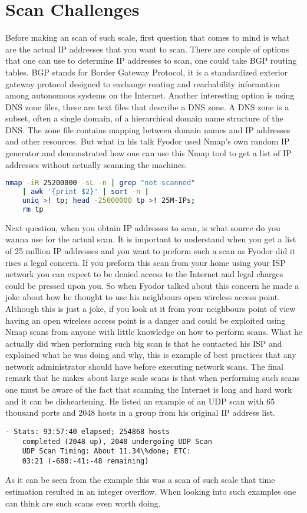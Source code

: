 \documentclass[times, utf8, seminar,english]{fer}
\begin{document}
\section{Scan Challenges}
Before making an scan of such scale, first question that comes to mind is what are the actual IP addresses that you want to scan. There are couple of options that one can use to determine IP addresses to scan, one could take BGP routing tables. BGP stands for Border Gateway Protocol, it is a standardized exterior gateway protocol designed to exchange routing and reachability information among autonomous systems on the Internet. Another interesting option is using DNS zone files, these are text files that describe a DNS zone. A DNS zone is a subset, often a single domain, of a hierarchical domain name structure of the DNS. The zone file contains mapping between domain names and IP addresses and other resources. But what in his talk Fyodor used Nmap's own random IP generator and demonstrated how one can use this Nmap tool to get a list of IP addresses without actually scanning the machines.
\begin{lstlisting}[language=bash, caption= Using Nmap to generate random IP addresses]
	nmap -iR 25200000 -sL -n | grep "not scanned" 
	| awk '{print $2}' | sort -n |
	uniq >! tp; head -25000000 tp >! 25M-IPs;
	rm tp
\end{lstlisting}
Next question, when you obtain IP addresses to scan, is what source do you wanna use for the actual scan. It is important to understand when you get a list of 25 million IP addresses and you want to preform such a scan as Fyodor did it rises a legal concern. If you preform this scan from your home using your ISP network you can expect to be denied access to the Internet and legal charges could be pressed upon you. So when Fyodor talked about this concern he made a joke about how he thought to use his neighbours open wireless access point. Although this is just a joke, if you look at it from your neighbours point of view having an open wireless access point is a danger and could be exploited using Nmap scans from anyone with little knowledge on how to perform scans. What he actually did when performing such big scan is that he contacted his ISP and explained what he was doing and why, this is example of best practices that any network administrator should have before executing network scans. The final remark that he makes about large scale scans is that when performing such scans one must be aware of the fact that scanning the Internet is long and hard work and it can be disheartening. He listed an example of an UDP scan with 65 thousand ports and 2048 hosts in a group from his original IP address list.
\begin{lstlisting}[caption=UDP Scan performance example]
	- Stats: 93:57:40 elapsed; 254868 hosts
	completed (2048 up), 2048 undergoing UDP Scan
	UDP Scan Timing: About 11.34\%done; ETC:
	03:21 (-688:-41:-48 remaining)
\end{lstlisting}
As it can be seen from the example this was a scan of such scale that time estimation resulted in an integer overflow. When looking into such examples one can think are such scans even worth doing.
\end{document}
